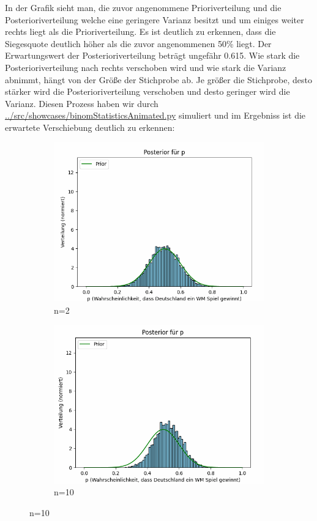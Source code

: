 \documentclass[a4paper,12pt]{article}
\begin{document}
\noindent In der Grafik sieht man, die zuvor angenommene Prioriverteilung und die Posterioriverteilung welche eine geringere Varianz besitzt und um einiges weiter rechts liegt als die Prioriverteilung. Es ist deutlich zu erkennen, dass die Siegesquote deutlich höher als die zuvor angenommenen 50\% liegt. Der Erwartungswert der Posterioriverteilung beträgt ungefähr 0.615.
\newpage
\noindent Wie stark die Posterioriverteilung nach rechts verschoben wird und wie stark die Varianz abnimmt, hängt von der Größe der Stichprobe ab. Je größer die Stichprobe, desto stärker wird die Posterioriverteilung verschoben und desto geringer wird die Varianz. Diesen Prozess haben wir durch \url{../src/showcases/binomStatisticsAnimated.py} simuliert und im Ergebniss ist die erwartete Verschiebung deutlich zu erkennen:
\begin{figure}[h]
  \centering
  \begin{subfigure}[b]{0.45\textwidth}
      \includegraphics[width=\textwidth]{../images/framesAnimatedSampleSize/frame1.png}
      \caption{n=2}
      \label{fig:bild1}
  \end{subfigure}
  \hfill
  \begin{subfigure}[b]{0.45\textwidth}
      \includegraphics[width=\textwidth]{../images/framesAnimatedSampleSize/frame2.png}
      \caption{n=10}
      \label{fig:bild2}
  \end{subfigure}
  

\end{figure}
\end{document}
